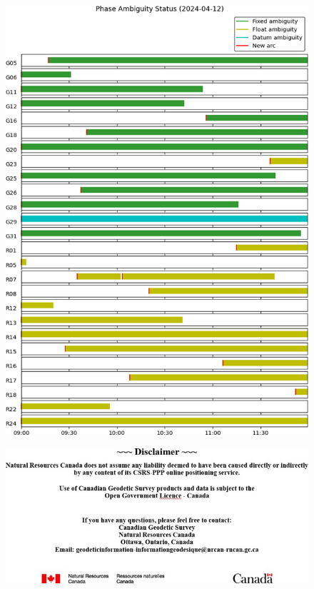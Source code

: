 \begin{figure}[hp]
	\centering
	\includegraphics[width=\linewidth]{images/picA06}
\end{figure}

\makeatletter
\setlength{\@fptop}{0pt}
\setlength{\@fpbot}{0pt plus 1fil}
\makeatother
\begin{figure}[hpt]
	\centering
	\includegraphics[width=\linewidth]{images/picA07}
\end{figure}








